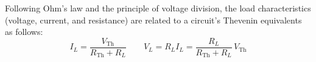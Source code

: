 \documentclass{article}
\begin{document}
    \smallskip\noindent
    Following Ohm's law and the principle of voltage division, the load characteristics (voltage, current, and resistance) are related to a circuit's Thevenin equivalents as follows:
    \[
        I_L = \frac{V_{\text{Th}}}{R_{\text{Th}}+R_L}
        \qquad
        V_L = R_L I_L = \frac{R_L}{R_{\text{Th}}+R_L}\,V_{\text{Th}}
    \]
\end{document}
